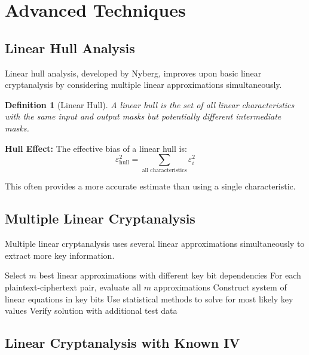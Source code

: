 \documentclass[12pt,a4paper]{article}
\newtheorem{definition}[theorem]{Definition}
\newcommand{\bias}{\varepsilon}
\begin{document}
\section{Advanced Techniques}

\subsection{Linear Hull Analysis}

Linear hull analysis, developed by Nyberg, improves upon basic linear cryptanalysis by considering multiple linear approximations simultaneously.

\begin{definition}[Linear Hull]
A linear hull is the set of all linear characteristics with the same input and output masks but potentially different intermediate masks.
\end{definition}

\begin{mathematicsbox}
\textbf{Hull Effect:}
The effective bias of a linear hull is:
$$\bias_{\text{hull}}^2 = \sum_{\text{all characteristics}} \bias_i^2$$

This often provides a more accurate estimate than using a single characteristic.
\end{mathematicsbox}

\subsection{Multiple Linear Cryptanalysis}

Multiple linear cryptanalysis uses several linear approximations simultaneously to extract more key information.

\begin{algorithmbox}[title=Multiple Linear Cryptanalysis]
\begin{algorithmic}
\State Select $m$ best linear approximations with different key bit dependencies
\State For each plaintext-ciphertext pair, evaluate all $m$ approximations
\State Construct system of linear equations in key bits
\State Use statistical methods to solve for most likely key values
\State Verify solution with additional test data
\end{algorithmic}
\end{algorithmbox}

\subsection{Linear Cryptanalysis with Known IV}
\end{document}

